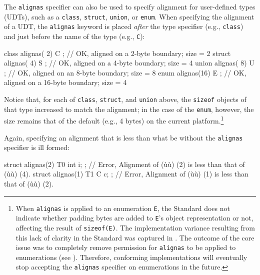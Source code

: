 The \lstinline!alignas! specifier can also be used to specify alignment for
user-defined types (UDTs), such as a \lstinline!class!, \lstinline!struct!,
\lstinline!union!, or \lstinline!enum!. When specifying the alignment of a UDT,
 the \lstinline!alignas! keyword is placed \emph{after} the
type specifier (e.g., \lstinline!class!) and just before the name of the
type (e.g., \lstinline!C!):

\begin{emcppslisting}
class  alignas( 2) C { }; // OK, aligned on a  2-byte boundary; size = 2
struct alignas( 4) S { }; // OK, aligned on a  4-byte boundary; size = 4
union  alignas( 8) U { }; // OK, aligned on an 8-byte boundary; size = 8
enum   alignas(16) E { }; // OK, aligned on a 16-byte boundary; size = 4
\end{emcppslisting}

\noindent Notice that, for each of \lstinline!class!, \lstinline!struct!, and
\lstinline!union! above, the \lstinline!sizeof! objects of that type increased
to match the alignment; in the case of the \lstinline!enum!, however, the
size remains that of the default  (e.g., 4
bytes) on the current platform.{\cprotect\footnote{When \lstinline!alignas!
is applied to an enumeration \lstinline!E!, the Standard does not
indicate whether padding bytes are added to \lstinline!E!'s object
representation or not, affecting the result of \lstinline!sizeof(E)!. The
implementation variance resulting from this lack of clarity in the
  Standard was captured in \cite{miller17}. The outcome of the core
  issue was to completely remove permission for \lstinline!alignas! to be
  applied to enumerations (see \cite{iso18a}). Therefore, conforming implementations will
  eventually stop accepting the \lstinline!alignas! specifier on
  enumerations in the future.}}

Again, specifying an alignment that is less than what be without the \lstinline!alignas! specifier is ill formed:

\begin{emcppslisting}
struct alignas(2) T0 { int i; };
    // Error, Alignment of (ù{}ù) (2) is less than that of (ù{}ù) (4).
struct alignas(1) T1 { C c; };
    // Error, Alignment of (ù{}ù) (1) is less than that of (ù{}ù) (2).
\end{emcppslisting}



